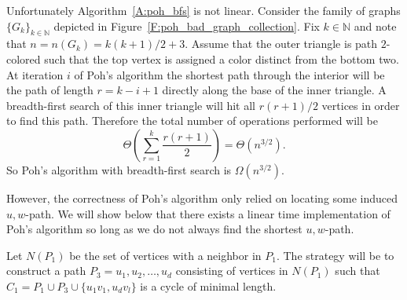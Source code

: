 \documentclass[12pt,letterpaper]{article}
\theoremstyle{plain}
\theoremstyle{definition}
\theoremstyle{break}
\begin{document}
Unfortunately Algorithm~\ref{A:poh_bfs}
is not linear. Consider the family of
graphs $\{G_k\}_{k\in\mathbb{N}}$ depicted in
Figure~\ref{F:poh_bad_graph_collection}. Fix $k\in\mathbb{N}$ and note that
$n=n(G_k)=k(k+1)/2+3$. Assume
that the outer triangle is path $2$-colored such that the top vertex is
assigned a color distinct from the bottom two. At iteration $i$ of Poh's
algorithm the shortest path through the interior will be the path of length
$r=k-i+1$ directly along the base of the inner triangle. A breadth-first search
of this inner triangle will hit all $r(r+1)/2$ vertices in order to find this
path. Therefore the total number of operations performed will be
\[
    \Theta\left( \sum_{r=1}^k\frac{r(r+1)}{2} \right)=\Theta(n^{3/2}).
\]
So Poh's algorithm with breadth-first search is $\Omega(n^{3/2})$.

However, the correctness of Poh's algorithm only relied on
locating some induced $u,w$-path.
We will show below that there exists a linear time implementation of Poh's
algorithm so long as we do not always find the shortest $u,w$-path.

Let $N(P_1)$ be the set of vertices with a neighbor in $P_1$. The
strategy will be to construct a
path $P_3=u_1,u_2,\ldots,u_d$ consisting of vertices in $N(P_1)$
such that $C_1=P_1\cup P_3\cup\{u_1v_1,u_dv_l\}$ is a cycle of minimal length.
\end{document}
